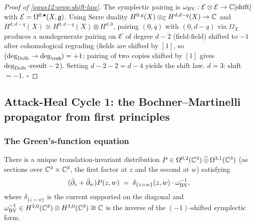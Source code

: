 \begin{proof}[Proof of \ref{opus12:prop:shift-law}]
The symplectic pairing is
$\omega_{\mathrm{BV}}: \mathcal{E} \otimes \mathcal{E} \to \mathbb{C}[\mathrm{shift}]$
with $\mathcal{E} = \Omega^{0,\bullet}(X, \mathfrak{g})$. Using Serre duality
$H^{0,q}(X) \otimes_{\mathbb{C}} H^{d,d-q}(X) \to \mathbb{C}$ and
$H^{d,d-q}(X) \cong H^{0, d-q}(X) \otimes H^{d,0}$, pairing
$(0, q)$ with $(0, d-q)$ via $\Omega_X$ produces a nondegenerate
pairing on $\mathcal{E}$ of degree $d - 2$ (field-field) shifted to $-1$
after cohomological regrading (fields are shifted by $[1]$, so
$(\deg_{\Dolb} \to \deg_{\coh}) = +1$; pairing of two copies shifted
by $[1]$ gives $\deg_{\mathrm{Dolb}} \text{-result} - 2$). Setting
$d - 2 - 2 = d - 4$ yields the shift law. $d = 3$: shift $= -1$. $\square$
\end{proof}

\subsection{Attack-Heal Cycle 1: the Bochner--Martinelli propagator from first principles}
\label{opus12:sec:cycle1-propagator}

\begin{center}
\end{center}

\subsubsection{The Green's-function equation}

\begin{lemma}\ClaimStatusLemma
\label{opus12:lem:green}
There is a unique translation-invariant distribution
$P \in \Omega^{0, 2}(\mathbb{C}^3)\,\widehat\otimes\, \Omega^{3, 1}(\mathbb{C}^3)$
(as sections over $\mathbb{C}^3 \times \mathbb{C}^3$, the first factor at $z$
and the second at $w$) satisfying
\[
(\bar\partial_z + \bar\partial_w) P(z, w) \;=\;
\delta_{\{z = w\}}(z, w) \cdot \omega_{\mathrm{BV}}^{-1},
\]
where $\delta_{\{z = w\}}$ is the current supported on the diagonal
and $\omega_{\mathrm{BV}}^{-1} \in H^{3,0}(\mathbb{C}^3) \otimes H^{3,0}(\mathbb{C}^3)
\cong \mathbb{C}$ is the inverse of the $(-1)$-shifted symplectic form.
\end{lemma}


